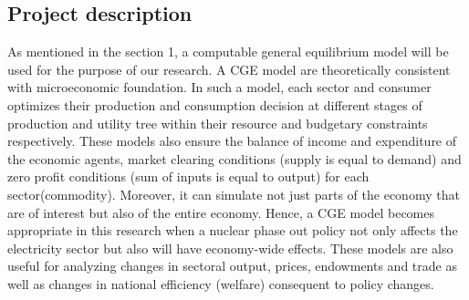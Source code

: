 \documentclass[10pt,a4paper]{article}
\begin{document}
\begin{comment}
Nuclear safety and waste disposal.: Number of people surrounding nuclear power plant at 30 km radius.
Current political situation regarding nuclear phase out in Sweden: What current government says and what its opposition parties says
To represent the government plan,
To represent the opposition parties plan,
Potential role of hydropower, renewable and carbon capture and sequestration.
Current energy status of Sweden.
Considering the nuclear power to be phase out, and the possibility of substituting it by relatively in expensive technique of fossil fuel power is excluded due to CO2 commitment and hydropower development is restricted due to its capacity, then the price and supply of electricity will most certainly be affected.

To expand hydroelectric power or to revert to importing oil and gas to substitute for nuclear energy are hardly options for an environmentally conscious state like Sweden. Moreover, replacing nuclear power with renewable energy sources is not currently a realistic option.

The purpose of this research is to examine the effects of different policy scenarios with respect to Swedish energy policy, specifically issues concerning a nuclear phase-out and restrictions on CO2 emissions.

\end{comment}



\subsection{Project description}
As mentioned in the section 1, a computable general equilibrium model will be used for the purpose of our research. A CGE model are theoretically consistent with microeconomic foundation. In such a model, each sector and consumer optimizes their production and consumption decision at different stages of production and utility tree within their resource and budgetary constraints respectively. These models also ensure the balance of income and expenditure of the economic agents, market clearing conditions (supply is equal to demand) and zero profit conditions (sum of inputs is equal to output) for each sector(commodity). Moreover, it can simulate not just parts of the economy that are of interest but also of the entire economy. Hence, a CGE model becomes appropriate in this research when a nuclear phase out policy not only affects the electricity sector but also will have economy-wide effects. These models are also useful for analyzing changes in sectoral output, prices, endowments and trade as well as changes in national efficiency (welfare) consequent to policy changes.
\end{document}
